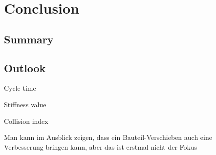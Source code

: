 \chapter{Conclusion}%

\section{Summary}%

\section{Outlook}%
		Cycle time 
		
		
				Stiffness value
				
				
				
				
						Collision index


Man kann im Ausblick zeigen, dass ein Bauteil-Verschieben auch eine Verbesserung bringen kann, aber das ist erstmal nicht der Fokus